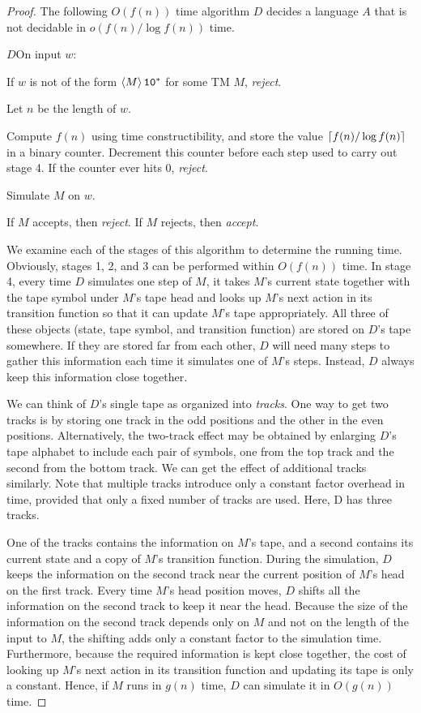 \documentclass[11pt,twoside=off,numbers=noenddot]{scrbook}
\begin{document}
\begin{proof}
  The following $O(f(n))$ time algorithm $D$ decides a language $A$ that is not decidable in $o(f(n) / \log f(n))$ time.

  \begin{turing}{$D$}{On input $w$:}
  \item If $w$ is not of the form $\left< M \right>\texttt{1}\texttt{0}^\ast$ for some TM $M$, \emph{reject}.
  \item Let $n$ be the length of $w$.
  \item Compute $f(n)$ using time constructibility, and store the value $\lceil f(n) / \log f(n) \rceil$ in a binary counter. Decrement this counter before each step used to carry out stage 4. If the counter ever hits 0, \emph{reject}.
  \item Simulate $M$ on $w$.
  \item If $M$ accepts, then \emph{reject}. If $M$ rejects, then \emph{accept}.
  \end{turing}

  We examine each of the stages of this algorithm to determine the running time. Obviously, stages 1, 2, and 3 can be performed within $O(f(n))$ time. In stage 4, every time $D$ simulates one step of $M$, it takes $M$'s current state together with the tape symbol under $M$'s tape head and looks up $M$'s next action in its transition function so that it can update $M$'s tape appropriately. All three of these objects (state, tape symbol, and transition function) are stored on $D$'s tape somewhere. If they are stored far from each other, $D$ will need many steps to gather this information each time it simulates one of $M$'s steps. Instead, $D$ always keep this information close together.

  We can think of $D$'s single tape as organized into \emph{tracks}. One way to get two tracks is by storing one track in the odd positions and the other in the even positions. Alternatively, the two-track effect may be obtained by enlarging $D$'s tape alphabet to include each pair of symbols, one from the top track and the second from the bottom track. We can get the effect of additional tracks similarly. Note that multiple tracks introduce only a constant factor overhead in time, provided that only a fixed number of tracks are used. Here, D has three tracks.

  One of the tracks contains the information on $M$'s tape, and a second contains its current state and a copy of $M$'s transition function. During the simulation, $D$ keeps the information on the second track near the current position of $M$'s head on the first track. Every time $M$'s head position moves, $D$ shifts all the information on the second track to keep it near the head. Because the size of the information on the second track depends only on $M$ and not on the length of the input to $M$, the shifting adds only a constant factor to the simulation time. Furthermore, because the required information is kept close together, the cost of looking up $M$'s next action in its transition function and updating its tape is only a constant. Hence, if $M$ runs in $g(n)$ time, $D$ can simulate it in $O(g(n))$ time.


\end{proof}
\end{document}
